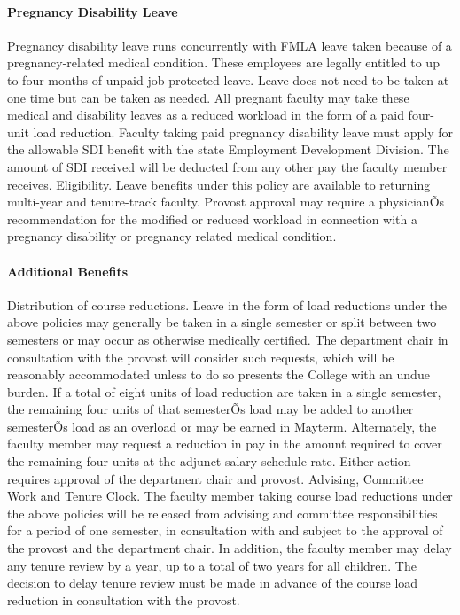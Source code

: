 \documentclass[letterpaper, 11pt]{article}
\begin{document}
			\paragraph{Pregnancy Disability Leave}
				Pregnancy disability leave runs concurrently with FMLA leave taken because of a pregnancy-related medical condition. These employees are legally entitled to up to four months of unpaid job protected leave. Leave does not need to be taken at one time but can be taken as needed.
				All pregnant faculty may take these medical and disability leaves as a reduced workload in the form of a paid four-unit load reduction. Faculty taking paid pregnancy disability leave must apply for the allowable SDI benefit with the state Employment Development Division. The amount of SDI received will be deducted from any other pay the faculty member receives.
				Eligibility. Leave benefits under this policy are available to returning multi-year and tenure-track faculty. Provost approval may require a physicianÕs recommendation for the modified or reduced workload in connection with a pregnancy disability or pregnancy related medical condition.

			\paragraph{Additional Benefits}
				Distribution of course reductions. Leave in the form of load reductions under the above policies may generally be taken in a single semester or split between two semesters or may occur as otherwise medically certified. The department chair in consultation with the provost will consider such requests, which will be reasonably accommodated unless to do so presents the College with an undue burden.
				If a total of eight units of load reduction are taken in a single semester, the remaining four units of that semesterÕs load may be added to another semesterÕs load as an overload or may be earned in Mayterm. Alternately, the faculty member may request a reduction in pay in the amount required to cover the remaining four units at the adjunct salary schedule rate. Either action requires approval of the department chair and provost.
				Advising, Committee Work and Tenure Clock.  The faculty member taking course load reductions under the above policies will be released from advising and committee responsibilities for a period of one semester, in consultation with and subject to the approval of the provost and the department chair. In addition, the faculty member may delay any tenure review by a year, up to a total of two years for all children.  The decision to delay tenure review must be made in advance of the course load reduction in consultation with the provost.
\end{document}
